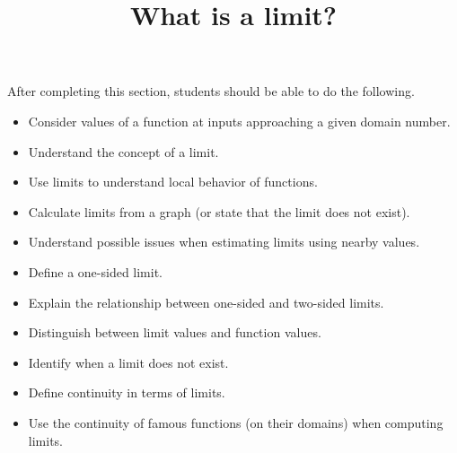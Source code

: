 \documentclass{ximera}
\title{What is a limit?}
\begin{document}
\begin{abstract}
\end{abstract}

\maketitle

\begin{sectionOutcomes}
After completing this section, students should be able to do the following.

\begin{itemize}
	\item Consider  values of a function  at inputs approaching a given domain number.
	\item Understand the concept of a limit.
        \item Use limits to understand local behavior of functions.
	\item Calculate limits from a graph (or state that the limit does not exist).
	\item Understand possible issues when estimating limits using
          nearby values.
	\item Define a one-sided limit.
	\item Explain the relationship between one-sided and two-sided limits.
	\item Distinguish between limit values and function values.
	\item Identify when a limit does not exist.
	\item Define continuity in terms of limits.
	\item Use the continuity of famous functions (on their domains) when computing limits. 
     
\end{itemize}
\end{sectionOutcomes}
\end{document}

